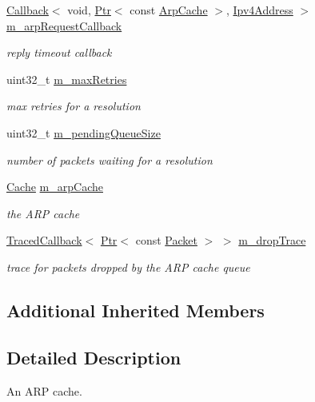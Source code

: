 \begin{DoxyCompactItemize}
\hyperlink{classns3_1_1Callback}{Callback}$<$ void, \hyperlink{classns3_1_1Ptr}{Ptr}$<$ const \hyperlink{classns3_1_1ArpCache}{Arp\+Cache} $>$, \hyperlink{classns3_1_1Ipv4Address}{Ipv4\+Address} $>$ \hyperlink{classns3_1_1ArpCache_a91797ea0de773ea3b9ba84e8cd42a3e0}{m\+\_\+arp\+Request\+Callback}
\begin{DoxyCompactList}\small\item\em reply timeout callback \end{DoxyCompactList}\item 
uint32\+\_\+t \hyperlink{classns3_1_1ArpCache_a24f0460babb1745ff532b16710846ab9}{m\+\_\+max\+Retries}
\begin{DoxyCompactList}\small\item\em max retries for a resolution \end{DoxyCompactList}\item 
uint32\+\_\+t \hyperlink{classns3_1_1ArpCache_a70391342295055352cc9cfcf34d3cc52}{m\+\_\+pending\+Queue\+Size}
\begin{DoxyCompactList}\small\item\em number of packets waiting for a resolution \end{DoxyCompactList}\item 
\hyperlink{classns3_1_1ArpCache_a0d745162ea670b114dd1a313c69c4aab}{Cache} \hyperlink{classns3_1_1ArpCache_a952de05903ff6b400c332c1bad8e0fc6}{m\+\_\+arp\+Cache}
\begin{DoxyCompactList}\small\item\em the A\+RP cache \end{DoxyCompactList}\item 
\hyperlink{classns3_1_1TracedCallback}{Traced\+Callback}$<$ \hyperlink{classns3_1_1Ptr}{Ptr}$<$ const \hyperlink{classns3_1_1Packet}{Packet} $>$ $>$ \hyperlink{classns3_1_1ArpCache_a7f919ba19c2dbbae6f4d9251ded35fa3}{m\+\_\+drop\+Trace}
\begin{DoxyCompactList}\small\item\em trace for packets dropped by the A\+RP cache queue \end{DoxyCompactList}\end{DoxyCompactItemize}
\subsection*{Additional Inherited Members}


\subsection{Detailed Description}
An A\+RP cache. 

